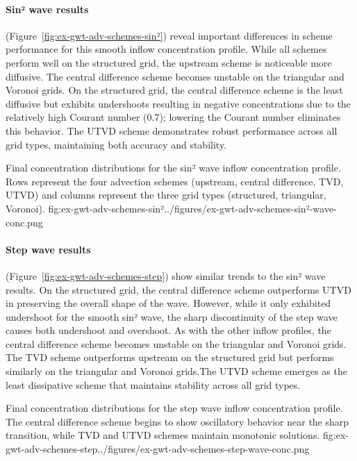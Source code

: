 \paragraph{Sin² wave results} (Figure~\ref{fig:ex-gwt-adv-schemes-sin²}) reveal important differences in scheme performance for this smooth inflow concentration profile. While all schemes perform well on the structured grid, the upstream scheme is noticeable more diffusive. The central difference scheme becomes unstable on the triangular and Voronoi grids. On the structured grid, the central difference scheme is the least diffusive but exhibits undershoots resulting in negative concentrations due to the relatively high Courant number (0.7); lowering the Courant number eliminates this behavior. The UTVD scheme demonstrates robust performance across all grid types, maintaining both accuracy and stability.
\begin{StandardFigure}{
    Final concentration distributions for the sin² wave inflow concentration profile. Rows represent the four advection schemes (upstream, central difference, TVD, UTVD) and columns represent the three grid types (structured, triangular, Voronoi).
}{fig:ex-gwt-adv-schemes-sin²}{../figures/ex-gwt-adv-schemes-sin²-wave-conc.png}
\end{StandardFigure}

\paragraph{Step wave results} (Figure~\ref{fig:ex-gwt-adv-schemes-step}) show similar trends to the sin² wave results. On the structured grid, the central difference scheme outperforms UTVD in preserving the overall shape of the wave. However, while it only exhibited undershoot for the smooth sin² wave, the sharp discontinuity of the step wave causes both undershoot and overshoot. As with the other inflow profiles, the central difference scheme becomes unstable on the triangular and Voronoi grids. The TVD scheme outperforms upstream on the structured grid but performs similarly on the triangular and Voronoi grids.The UTVD scheme emerges as the least dissipative scheme that maintains stability across all grid types.
\begin{StandardFigure}{
    Final concentration distributions for the step wave inflow concentration profile. The central difference scheme begins to show oscillatory behavior near the sharp transition, while TVD and UTVD schemes maintain monotonic solutions.
}{fig:ex-gwt-adv-schemes-step}{../figures/ex-gwt-adv-schemes-step-wave-conc.png}
\end{StandardFigure}

